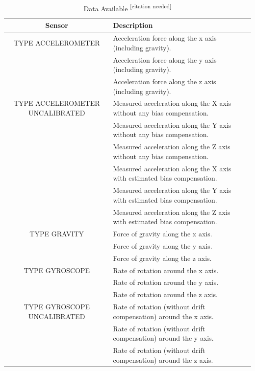 \documentclass{UoNMCHA}
\newcommand{\citationneeded}{\textsuperscript{\color{blue} [citation needed]}}
\numberwithin{equation}{section}
\begin{document}
\begin{table}[h!]
    \begin{center}
        \caption{Data Available\citationneeded}\label{tab:AndroidDataAvailable}
        {\footnotesize
            \begin{tabular}{c l l l|}
                \hline\hline Sensor & Description \\ \hline 
                TYPE ACCELEROMETER & Acceleration force along the x axis (including gravity). \\
                 & Acceleration force along the y axis (including gravity). \\
                  & Acceleration force along the z axis (including gravity). \\
                TYPE ACCELEROMETER UNCALIBRATED & Measured acceleration along the X axis without any bias compensation. \\
                  & Measured acceleration along the Y axis without any bias compensation. \\
                  & Measured acceleration along the Z axis without any bias compensation. \\
                  & Measured acceleration along the X axis with estimated bias compensation. \\
                  & Measured acceleration along the Y axis with estimated bias compensation. \\
                  & Measured acceleration along the Z axis with estimated bias compensation. \\
                TYPE GRAVITY & Force of gravity along the x axis. \\
                 & Force of gravity along the y axis. \\
                 & Force of gravity along the z axis. \\
                TYPE GYROSCOPE & Rate of rotation around the x axis. \\
                  & Rate of rotation around the y axis. \\
                  & Rate of rotation around the z axis. \\
                TYPE GYROSCOPE UNCALIBRATED & Rate of rotation (without drift compensation) around the x axis. \\
                  & Rate of rotation (without drift compensation) around the y axis. \\
                  & Rate of rotation (without drift compensation) around the z axis. \\

\end{tabular}}
\end{center}
\end{table}
\end{document}
